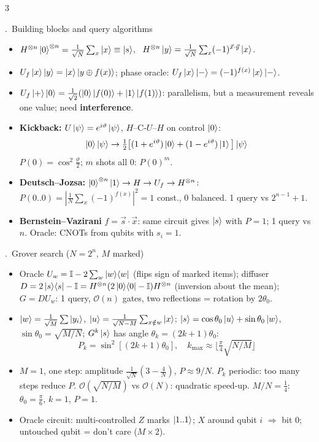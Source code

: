 \documentclass[8pt,a4paper]{extarticle}
\newcounter{sec}\newcounter{ssec}[sec]
\newcommand{\sect}[1]{\stepcounter{sec}\par\vspace{2pt}\noindent\colorbox{hd}{\parbox{\dimexpr\linewidth-2\fboxsep}{\color{white}\bfseries\strut\arabic{sec}.\ #1}}\par\vspace{0.5pt}}
\newcommand{\id}{\mathbb{I}}
\newcommand{\pr}[1]{\ket{#1}\!\bra{#1}}
\begin{document}
\begin{multicols}{3}
\sect{Building blocks and query algorithms}
\begin{itemize}
\item $H^{\otimes n}\ket0^{\otimes n}=\frac1{\sqrt N}\sum_x\ket x\equiv\ket s$, \ $H^{\otimes n}\ket y=\frac1{\sqrt N}\sum_x(-1)^{\vec x\cdot\vec y}\ket x$.
\item $U_f\ket x\ket y=\ket x\ket{y\oplus f(x)}$; phase oracle: $U_f\ket x\ket-=(-1)^{f(x)}\ket x\ket-$.
\item $U_f\ket+\ket0=\frac1{\sqrt2}(\ket0\ket{f(0)}+\ket1\ket{f(1)})$: parallelism, but a measurement reveals one value; need \textbf{interference}.
\item \textbf{Kickback:} $U\ket\psi=e^{i\vartheta}\ket\psi$, $H$--C-$U$--$H$ on control $\ket0$:
\[\ket0\ket\psi\to\tfrac12\big[(1+e^{i\vartheta})\ket0+(1-e^{i\vartheta})\ket1\big]\ket\psi\]
$P(0)=\cos^2\frac\vartheta2$; $m$ shots all $0$: $P(0)^m$.
\item \textbf{Deutsch--Jozsa:} $\ket0^{\otimes n}\ket1\to H\to U_f\to H^{\otimes n}$: $P(0..0)=|\frac1N\sum_x(-1)^{f(x)}|^2=1$ const., 0 balanced. 1 query vs $2^{n-1}+1$.
\item \textbf{Bernstein--Vazirani} $f=\vec s\cdot\vec x$: same circuit gives $\ket s$ with $P=1$; 1 query vs $n$. Oracle: CNOTs from qubits with $s_i=1$.
\end{itemize}

\sect{Grover search ($N=2^n$, $M$ marked)}
\begin{itemize}
\item Oracle $U_w=\id-2\sum_w\pr w$ (flips sign of marked items); diffuser $D=2\pr s-\id=H^{\otimes n}(2\pr0-\id)H^{\otimes n}$ (inversion about the mean); $G=DU_w$: 1 query, $\mathcal O(n)$ gates, two reflections = rotation by $2\theta_0$.
\item $\ket w=\frac1{\sqrt M}\sum\ket{y_i}$, $\ket u=\frac1{\sqrt{N-M}}\sum_{x\notin w}\ket x$; $\ket s=\cos\theta_0\ket u+\sin\theta_0\ket w$, $\sin\theta_0=\sqrt{M/N}$; $G^k\ket s$ has angle $\theta_k=(2k{+}1)\theta_0$:
\[P_k=\sin^2[(2k+1)\theta_0],\quad k_{\max}\approx\Big\lfloor\tfrac\pi4\sqrt{N/M}\Big\rfloor\]
\item $M=1$, one step: amplitude $\frac1{\sqrt N}(3-\frac4N)$, $P\approx9/N$. $P_k$ periodic: too many steps reduce $P$. $\mathcal O(\sqrt{N/M})$ vs $\mathcal O(N)$: quadratic speed-up. $M/N=\frac14$: $\theta_0=\frac\pi6$, $k=1$, $P=1$.
\item Oracle circuit: multi-controlled $Z$ marks $\ket{1..1}$; $X$ around qubit $i$ $\Rightarrow$ bit $0$; untouched qubit = don't care ($M\times2$).
\end{itemize}


\end{multicols}
\end{document}
